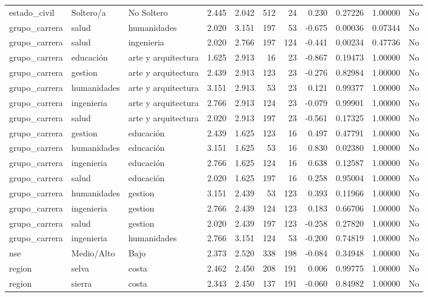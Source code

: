 \documentclass[
  letterpaper,
  DIV=11,
  numbers=noendperiod]{scrartcl}
\begin{document}
\begin{table}
\begin{tabular*}{\linewidth}{@{\extracolsep{\fill}}lllrrrrrrrl}
estado\_civil & Soltero/a & No Soltero & 2.445 & 2.042 & 512 & 24 & 0.230 & 0.27226 & 1.00000 & No \\ 
grupo\_carrera & salud & humanidades & 2.020 & 3.151 & 197 & 53 & -0.675 & 0.00036 & 0.07344 & No \\ 
grupo\_carrera & salud & ingenieria & 2.020 & 2.766 & 197 & 124 & -0.441 & 0.00234 & 0.47736 & No \\ 
grupo\_carrera & educación & arte y arquitectura & 1.625 & 2.913 & 16 & 23 & -0.867 & 0.19473 & 1.00000 & No \\ 
grupo\_carrera & gestion & arte y arquitectura & 2.439 & 2.913 & 123 & 23 & -0.276 & 0.82984 & 1.00000 & No \\ 
grupo\_carrera & humanidades & arte y arquitectura & 3.151 & 2.913 & 53 & 23 & 0.121 & 0.99377 & 1.00000 & No \\ 
grupo\_carrera & ingenieria & arte y arquitectura & 2.766 & 2.913 & 124 & 23 & -0.079 & 0.99901 & 1.00000 & No \\ 
grupo\_carrera & salud & arte y arquitectura & 2.020 & 2.913 & 197 & 23 & -0.561 & 0.17325 & 1.00000 & No \\ 
grupo\_carrera & gestion & educación & 2.439 & 1.625 & 123 & 16 & 0.497 & 0.47791 & 1.00000 & No \\ 
grupo\_carrera & humanidades & educación & 3.151 & 1.625 & 53 & 16 & 0.830 & 0.02380 & 1.00000 & No \\ 
grupo\_carrera & ingenieria & educación & 2.766 & 1.625 & 124 & 16 & 0.638 & 0.12587 & 1.00000 & No \\ 
grupo\_carrera & salud & educación & 2.020 & 1.625 & 197 & 16 & 0.258 & 0.95004 & 1.00000 & No \\ 
grupo\_carrera & humanidades & gestion & 3.151 & 2.439 & 53 & 123 & 0.393 & 0.11966 & 1.00000 & No \\ 
grupo\_carrera & ingenieria & gestion & 2.766 & 2.439 & 124 & 123 & 0.183 & 0.66706 & 1.00000 & No \\ 
grupo\_carrera & salud & gestion & 2.020 & 2.439 & 197 & 123 & -0.258 & 0.27820 & 1.00000 & No \\ 
grupo\_carrera & ingenieria & humanidades & 2.766 & 3.151 & 124 & 53 & -0.200 & 0.74819 & 1.00000 & No \\ 
nse & Medio/Alto & Bajo & 2.373 & 2.520 & 338 & 198 & -0.084 & 0.34948 & 1.00000 & No \\ 
region & selva & costa & 2.462 & 2.450 & 208 & 191 & 0.006 & 0.99775 & 1.00000 & No \\ 
region & sierra & costa & 2.343 & 2.450 & 137 & 191 & -0.060 & 0.84982 & 1.00000 & No \\ 

\end{tabular*}
\end{table}
\end{document}
